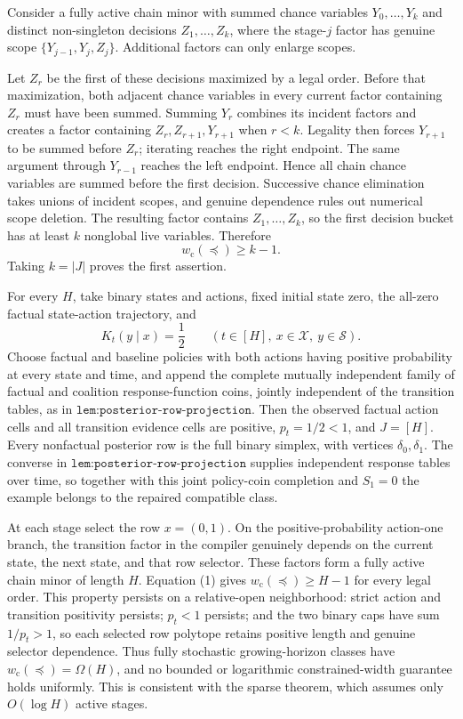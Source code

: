 Consider a fully active chain minor with summed chance variables \(Y_0,\ldots,Y_k\) and distinct non-singleton decisions \(Z_1,\ldots,Z_k\), where the stage-\(j\) factor has genuine scope \(\{Y_{j-1},Y_j,Z_j\}\).  Additional factors can only enlarge scopes.

Let \(Z_r\) be the first of these decisions maximized by a legal order.  Before that maximization, both adjacent chance variables in every current factor containing \(Z_r\) must have been summed.  Summing \(Y_r\) combines its incident factors and creates a factor containing \(Z_r,Z_{r+1},Y_{r+1}\) when \(r<k\).  Legality then forces \(Y_{r+1}\) to be summed before \(Z_r\); iterating reaches the right endpoint.  The same argument through \(Y_{r-1}\) reaches the left endpoint.  Hence all chain chance variables are summed before the first decision.  Successive chance elimination takes unions of incident scopes, and genuine dependence rules out numerical scope deletion.  The resulting factor contains \(Z_1,\ldots,Z_k\), so the first decision bucket has at least \(k\) nonglobal live variables.  Therefore
\[
 w_{\mathrm c}(\preceq)\ge k-1. \tag{1}
\]
Taking \(k=|J|\) proves the first assertion.

For every \(H\), take binary states and actions, fixed initial state zero, the all-zero factual state-action trajectory, and
\[
 K_t(y\mid x)=\frac12
 \qquad(t\in[H],\ x\in\mathcal X,\ y\in\mathcal S). \tag{2}
\]
Choose factual and baseline policies with both actions having positive probability at every state and time, and append the complete mutually independent family of factual and coalition response-function coins, jointly independent of the transition tables, as in \(\texttt{lem:posterior-row-projection}\).  Then the observed factual action cells and all transition evidence cells are positive, \(p_t=1/2<1\), and \(J=[H]\).  Every nonfactual posterior row is the full binary simplex, with vertices \(\delta_0,\delta_1\).  The converse in \(\texttt{lem:posterior-row-projection}\) supplies independent response tables over time, so together with this joint policy-coin completion and \(S_1=0\) the example belongs to the repaired compatible class.

At each stage select the row \(x=(0,1)\).  On the positive-probability action-one branch, the transition factor in the compiler genuinely depends on the current state, the next state, and that row selector.  These factors form a fully active chain minor of length \(H\).  Equation (1) gives \(w_{\mathrm c}(\preceq)\ge H-1\) for every legal order.  This property persists on a relative-open neighborhood: strict action and transition positivity persists; \(p_t<1\) persists; and the two binary caps have sum \(1/p_t>1\), so each selected row polytope retains positive length and genuine selector dependence.  Thus fully stochastic growing-horizon classes have \(w_{\mathrm c}(\preceq)=\Omega(H)\), and no bounded or logarithmic constrained-width guarantee holds uniformly.  This is consistent with the sparse theorem, which assumes only \(O(\log H)\) active stages.